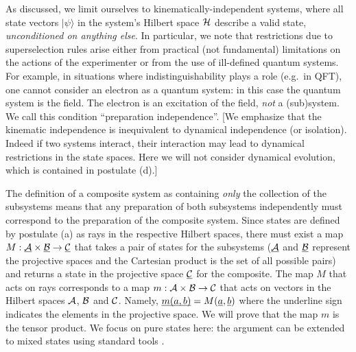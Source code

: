 \documentclass[aps,prl,amsmath,amssymb,twocolumn,nofootinbib]{revtex4}
\theoremstyle{plain}
\theoremstyle{definition}
\theoremstyle{remark}
\newcommand{\pj}[1] {\underbar{$#1$}}
\def\>{\rangle}
\def\commentg#1{ [{\bf Comment Gabriele:} {\sf #1}]}
\def\togli#1{}
\begin{document}
\togli{This axiomatization implicitly contains a definition of
  ``quantum system'' which is crucial for what follows, so we need to
  clarify the assumptions that it contains. We will use the following
  definition for a quantum
  system\togli{$\stackon[1pt]={\mbox{\tiny
        def}}$}$\stackrel{\mbox{\tiny def}}=${\em ``a quantum degree
    of freedom with $d$ (possibly discrete, or continuous, infinite)
    mutually exclusive (commuting) values for each of its properties.
    Its mathematical description is through a Hilbert space of
    dimension $d$ which contains all the states that describe the
    values of its possible properties. In accordance with the
    postulate (a), these values correspond to a basis of the space,
    given by the eigenvectors of the observable corresponding to that
    property''}. \commentg{We may have to revise to be more clear.
    Where is this used?} } As discussed, we limit ourselves to
kinemati\-cal\-ly-inde\-pen\-dent systems, where all state vectors
$|\psi\>$ in the system's Hilbert space $\cal H$ describe a valid
state, {\em unconditioned on anything else}. In particular, we note
that restrictions due to superselection rules arise either from
practical (not fundamental) limitations on the actions of the
experimenter \cite{susskind,zanardi,zanardilloyd} or from the use of
ill-defined quantum systems. For example, in situations where
indistinguishability plays a role (e.g.~in QFT), one cannot consider
an electron as a quantum system: in this case the quantum system is
the field. The electron is an excitation of the field, {\em not} a
(sub)system. We call this condition ``preparation independence''.  [We
emphasize that the kinematic independence is inequivalent to dynamical
independence (or isolation).  Indeed if two systems interact, their
interaction may lead to dynamical restrictions in the state spaces.
Here we will not consider dynamical evolution, which is contained in
postulate (d).]

The definition of a composite system as containing {\em only} the
collection of the subsystems means that any preparation of both
subsystems independently must correspond to the preparation of the
composite system. Since states are defined by postulate (a) as rays in
the respective Hilbert spaces, there must exist a map $M : \pj{\cal A}
\times \pj{\cal B } \to \pj{\cal C}$ that takes a pair of states for
the subsystems ($\pj{\cal A}$ and $\pj{\cal B }$ represent the
projective spaces and the Cartesian product is the set of all possible
pairs) and returns a state in the projective space $\pj{\cal C}$ for
the composite. The map $M$ that acts on rays corresponds to a map
$m:{\cal A}\times{\cal B}\to{\cal C}$ that acts on vectors in the
Hilbert spaces $\cal A$, $\cal B$ and $\cal C$.  Namely,
$\pj{m(a,b)}=M(\pj{a},\pj{b})$ where the underline sign indicates the
elements in the projective space. We will prove that the map $m$ is
the tensor product. We focus on pure states here: the argument can be
extended to mixed states using standard tools \cite{nielsenchuang}.
\end{document}
